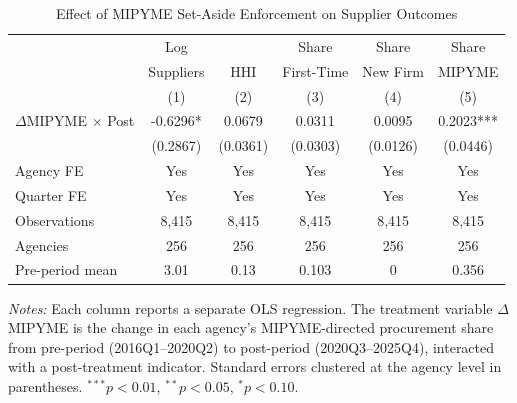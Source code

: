 \begin{table}[t]
\centering
\caption{Effect of MIPYME Set-Aside Enforcement on Supplier Outcomes}
\label{tab:main}
\begin{tabular}{lccccc}
\hline\hline
 & Log & & Share & Share & Share \\
 & Suppliers & HHI & First-Time & New Firm & MIPYME \\
 & (1) & (2) & (3) & (4) & (5) \\
\hline
$\Delta$MIPYME $\times$ Post & -0.6296* & 0.0679 & 0.0311 & 0.0095 & 0.2023*** \\
 & (0.2867) & (0.0361) & (0.0303) & (0.0126) & (0.0446) \\
\hline
Agency FE & Yes & Yes & Yes & Yes & Yes \\
Quarter FE & Yes & Yes & Yes & Yes & Yes \\
Observations & 8,415 & 8,415 & 8,415 & 8,415 & 8,415 \\
Agencies & 256 & 256 & 256 & 256 & 256 \\
Pre-period mean & 3.01 & 0.13 & 0.103 & 0 & 0.356 \\
\hline\hline
\end{tabular}
\begin{tablenotes}
\item \textit{Notes:} Each column reports a separate OLS regression. The treatment variable $\Delta$MIPYME is the change in each agency's MIPYME-directed procurement share from pre-period (2016Q1--2020Q2) to post-period (2020Q3--2025Q4), interacted with a post-treatment indicator. Standard errors clustered at the agency level in parentheses. $^{***}p<0.01$, $^{**}p<0.05$, $^{*}p<0.10$.
\end{tablenotes}
\end{table}

